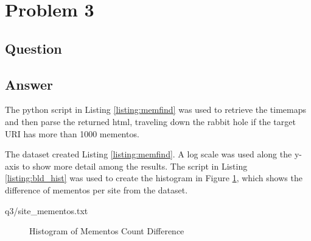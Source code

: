 \section{Problem 3}
\subsection{Question}


\subsection{Answer}
The python script in Listing \ref{listing:memfind} was used to retrieve the timemaps and then parse the returned html, traveling down the rabbit hole if the target URI has more than 1000 mementos.
\vspace{1mm}


\vspace{5mm}
The dataset created Listing \ref{listing:memfind}. A log scale was used along the y-axis to show more detail among the results. The script in Listing \ref{listing:bld_hist} was used to create the histogram in Figure \ref{fig:hist_ss}, which shows the difference of mementos per site from the dataset.
\vspace{2mm}

\vspace{2mm}

{q3/site_mementos.txt}
\vspace*{5pt}
\begin{figure}[h]
\centering
{}
\caption{Histogram of Mementos Count Difference}
\label{fig:hist_ss}
\end{figure}
